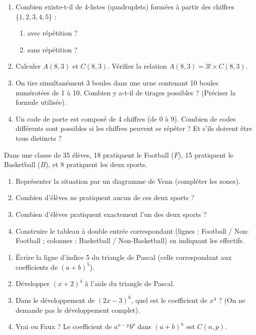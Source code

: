 \documentclass[11pt]{article}
\begin{document}
\begin{exercice}
\begin{enumerate}
    \item Combien existe-t-il de 4-listes (quadruplets) formées à partir des chiffres $\{1, 2, 3, 4, 5\}$ :
    \begin{enumerate}
        \item avec répétition ?
        \item sans répétition ?
    \end{enumerate}
    \item Calculer $A(8, 3)$ et $C(8, 3)$. Vérifier la relation $A(8,3) = 3! \times C(8,3)$.
    \item On tire simultanément 3 boules dans une urne contenant 10 boules numérotées de 1 à 10. Combien y a-t-il de tirages possibles ? (Préciser la formule utilisée).
    \item Un code de porte est composé de 4 chiffres (de 0 à 9). Combien de codes différents sont possibles si les chiffres peuvent se répéter ? Et s'ils doivent être tous distincts ?
\end{enumerate}
\end{exercice}

\begin{exercice}
Dans une classe de 35 élèves, 18 pratiquent le Football ($F$), 15 pratiquent le Basketball ($B$), et 8 pratiquent les deux sports.
\begin{enumerate}
    \item Représenter la situation par un diagramme de Venn (compléter les zones).
    \item Combien d'élèves ne pratiquent aucun de ces deux sports ?
    \item Combien d'élèves pratiquent exactement l'un des deux sports ?
    \item Construire le tableau à double entrée correspondant (lignes : Football / Non-Football ; colonnes : Basketball / Non-Basketball) en indiquant les effectifs.
\end{enumerate}
\end{exercice}

\begin{exercice}
\begin{enumerate}
    \item Écrire la ligne d'indice 5 du triangle de Pascal (celle correspondant aux coefficients de $(a+b)^5$).
    \item Développer $(x + 2)^4$ à l'aide du triangle de Pascal.
    \item Dans le développement de $(2x - 3)^6$, quel est le coefficient de $x^4$ ? (On ne demande pas le développement complet).
    \item Vrai ou Faux ? Le coefficient de $a^{n-p}b^p$ dans $(a+b)^n$ est $C(n,p)$.
\end{enumerate}
\end{exercice}
\end{document}
